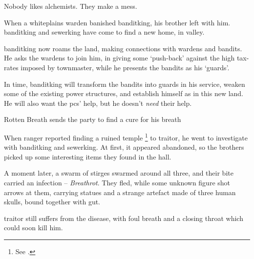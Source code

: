 \label{entitlement}


\begin{exampletext}
  \noindent
  Nobody likes alchemists.
  They make a mess.

  When a \gls{whiteplains} \gls{warden} banished \gls{banditking}, his brother left with him.
  \Gls{banditking} and \gls{sewerking} have come to find a new home, in \gls{valley}.

  \Gls{banditking} now roams the land, making connections with \glspl{warden} and bandits.
  He asks the \glspl{warden} to join him, in giving some `push-back' against the high tax-rates imposed by \gls{townmaster}, while he presents the bandits as his `guards'.
\end{exampletext}

In time, \gls{banditking} will transform the bandits into \glspl{guard} in his service, weaken some of the existing power structures, and establish himself as  in this new land.
He will also want the \glspl{pc}' help, but he doesn't \emph{need} their help.

{Rotten Breath}%
{ sends the party to find a cure for his breath}%
\label{rottenBreath}

\begin{exampletext}
  When  \gls{ranger} reported finding a ruined temple%
  \footnote{See .}
  to \gls{traitor}, he went to investigate with \gls{banditking} and \gls{sewerking}.
  At first, it appeared abandoned, so the brothers picked up some interesting items they found in the hall.

  A moment later, a swarm of stirges swarmed around all three, and their bite carried an infection -- \textit{Breathrot}.%
  They fled, while some unknown figure shot arrows at them, carrying statues and a strange \gls{artefact} made of three human skulls, bound together with gut.

  \Gls{traitor} still suffers from the disease, with foul breath and a closing throat which could soon kill him.
\end{exampletext}

